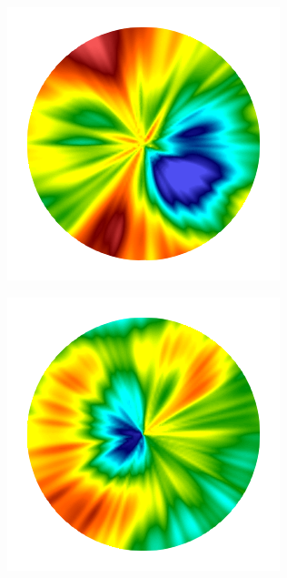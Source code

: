 \begin{figure}[htb!]
\begin{subfigure}{0.18\textwidth}
    \end{subfigure}
    \begin{subfigure}{0.19\textwidth}
        \includegraphics[width=\textwidth]{past/figures/Gc_radial.png}
    \end{subfigure}
    \begin{subfigure}{0.19\textwidth}
        \includegraphics[width=\textwidth]{past/figures/psic_radial.png}

\end{subfigure}
\end{figure}
